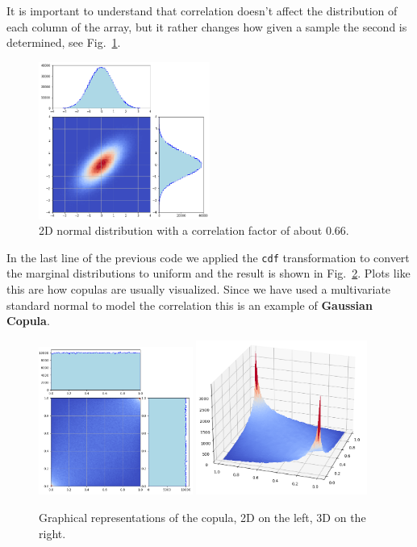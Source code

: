 It is important to understand that correlation doesn't affect the distribution of each column of the array, but it rather changes how given a sample the second is determined, see Fig.~\ref{fig:multivariate_with_correlation}.

\begin{figure}[htbp]
\centering
\includegraphics[width=0.5\textwidth]{figures/multivariate_2d_corr_bmw_sie}
\caption{2D normal distribution with a correlation factor of about 0.66.}
\label{fig:multivariate_with_correlation}
\end{figure}
    
In the last line of the previous code we applied the \texttt{cdf} transformation to convert the marginal distributions to uniform and 
the result is shown in Fig.~\ref{fig:copula}. Plots like this are how copulas are usually visualized. Since we have used a multivariate standard normal to model the correlation this is an example of \textbf{Gaussian Copula}.

\begin{figure}[htbp]
\centering
\includegraphics[width=0.45\textwidth]{figures/copula_2d}
\quad
\includegraphics[width=0.5\textwidth]{figures/copula_3d}
\caption{Graphical representations of the copula, 2D on the left, 3D on the right.}
\label{fig:copula}
\end{figure}

